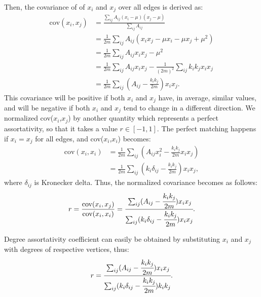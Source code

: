 \documentclass{article}
\begin{document}
Then, the covariance of of $x_i$ and $x_j$ over all edges is derived as:
	\begin{equation}
	\begin{split}
	\text{cov}(x_i, x_j)  &= \frac
					{ \sum_{ij}A_{ij}(x_i - \mu)(x_j - \mu) }
					{\sum_{ij}A_{ij} } \\
					&= \frac{1}{2m}\sum_{ij}A_{ij} (x_i x_j - \mu x_i - \mu x_j +\mu^2) \\
					&= \frac{1}{2m}\sum_{ij}A_{ij}x_i x_j - \mu^2 \\
					&= \frac{1}{2m}\sum_{ij}A_{ij}x_i x_j - \frac{1}{(2m)^2}\sum_{ij}k_i k_j x_i x_j \\
					&= \frac{1}{2m}\sum_{ij}(A_{ij} - \frac{k_i k_j}{2m})x_i x_j.
	\end{split}
	\end{equation}
This covariance will be positive if both $x_i$ and $x_j$ have, in average, similar values, and will be negative if both $x_i$ and $x_j$ tend to change in a different direction. We normalized cov($x_i$,$x_j$) by another quantity which represents a perfect assortativity, so that it takes a value $r \in [-1 ,1]$. The perfect matching happens if $x_i = x_j$ for all edges, and cov($x_i$,$x_i$) becomes:
	\begin{equation}
	\begin{split}
	 \text{cov}(x_i, x_i) &=  \frac{1}{2m}\sum_{ij}(A_{ij} x_i^2 - \frac{k_i k_j}{2m} x_i x_j) \\
	 		             &=  \frac{1}{2m}\sum_{ij}(k_i \delta_{ij} - \frac{k_i k_j}{2m}) x_i x_j,
	\end{split}
	\end{equation}
	where $\delta_{ij}$ is Kronecker delta.
Thus, the normalized covariance becomes as follows:
	\begin{equation}
	\begin{split}
	 r = \frac{ \text{cov}(x_i, x_j)}{ \text{cov}(x_i, x_i)} = 
	 \cfrac{\sum_{ij}(A_{ij} - \cfrac{k_i k_j}{2m})x_i x_j}{\sum_{ij}(k_i \delta_{ij} - \cfrac{k_i k_j}{2m}) x_i x_j}.
	\end{split}
	\end{equation}

Degree assortativity coefficient can easily be obtained by substituting $x_i$ and $x_j$ with degrees of respective vertices, thus:
	\begin{equation}
	 r =  \cfrac{\sum_{ij}(A_{ij} - \cfrac{k_i k_j}{2m})x_i x_j}{\sum_{ij}(k_i \delta_{ij} - \cfrac{k_i k_j}{2m}) k_i k_j}.
	\end{equation}
\end{document}
